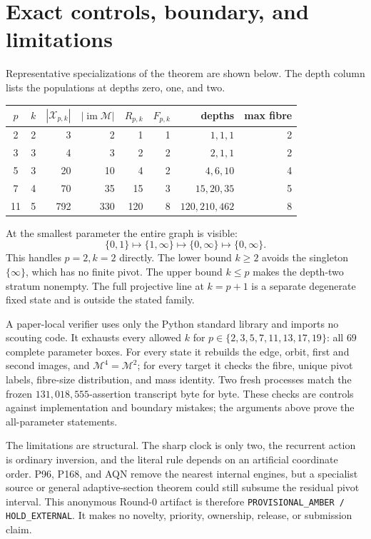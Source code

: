 \documentclass[a4paper,10pt]{amsart}
\theoremstyle{remark}
\newcommand{\X}{\mathcal X}
\newcommand{\M}{\mathcal M}
\newcommand{\im}{\operatorname{im}}
\begin{document}
\section{Exact controls, boundary, and limitations}

Representative specializations of the theorem are shown below.  The depth
column lists the populations at depths zero, one, and two.

\begin{center}
\begin{tabular}{c@{,}c@{\quad}rrrrrr}
\toprule
$p$&$k$&$|\X_{p,k}|$&$|\im\M|$&$R_{p,k}$&$F_{p,k}$&depths&max fibre\\
\midrule
2&2&3&2&1&1&$1,1,1$&2\\
3&3&4&3&2&2&$2,1,1$&2\\
5&3&20&10&4&2&$4,6,10$&4\\
7&4&70&35&15&3&$15,20,35$&5\\
11&5&792&330&120&8&$120,210,462$&8\\
\bottomrule
\end{tabular}
\end{center}

At the smallest parameter the entire graph is visible:
\[
 \{0,1\}\longmapsto\{1,\infty\}
 \longmapsto\{0,\infty\}\longmapsto\{0,\infty\}.
\]
This handles $p=2,k=2$ directly.  The lower bound $k\geq2$ avoids the
singleton $\{\infty\}$, which has no finite pivot.  The upper bound $k\leq p$
makes the depth-two stratum nonempty.  The full projective line at $k=p+1$
is a separate degenerate fixed state and is outside the stated family.

A paper-local verifier uses only the Python standard library and imports no
scouting code.  It exhausts every allowed $k$ for
$p\in\{2,3,5,7,11,13,17,19\}$: all $69$ complete parameter boxes.  For every
state it rebuilds the edge, orbit, first and second images, and
$\M^4=\M^2$; for every target it checks the fibre, unique pivot labels,
fibre-size distribution, and mass identity.  Two fresh processes match the
frozen $131{,}018{,}555$-assertion transcript byte for byte.  These checks
are controls against implementation and boundary mistakes; the arguments
above prove the all-parameter statements.

The limitations are structural.  The sharp clock is only two, the recurrent
action is ordinary inversion, and the literal rule depends on an artificial
coordinate order.  P96, P168, and AQN remove the nearest internal engines,
but a specialist source or general adaptive-section theorem could still
subsume the residual pivot interval.  This anonymous Round-0 artifact is
therefore \texttt{PROVISIONAL\_AMBER / HOLD\_EXTERNAL}.  It makes no novelty,
priority, ownership, release, or submission claim.



\end{document}
